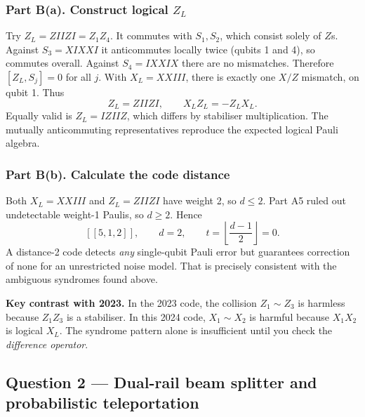 \subsubsection*{Part B(a). Construct logical $Z_L$}
Try $Z_L=ZIIZI=Z_1Z_4$. It commutes with $S_1,S_2$, which consist solely of $Z$s. Against $S_3=XIXXI$ it anticommutes locally twice (qubits 1 and 4), so commutes overall. Against $S_4=IXXIX$ there are no mismatches. Therefore $[Z_L,S_j]=0$ for all $j$.
With $X_L=XXIII$, there is exactly one $X/Z$ mismatch, on qubit 1. Thus
\begin{equation}\boxed{Z_L=ZIIZI,\qquad X_LZ_L=-Z_LX_L.}\end{equation}
Equally valid is $Z_L=IZIIZ$, which differs by stabiliser multiplication. The mutually anticommuting representatives reproduce the expected logical Pauli algebra.

\subsubsection*{Part B(b). Calculate the code distance}
Both $X_L=XXIII$ and $Z_L=ZIIZI$ have weight 2, so $d\le2$. Part A5 ruled out undetectable weight-1 Paulis, so $d\ge2$. Hence
\begin{equation}\boxed{[[5,1,2]],\qquad d=2,\qquad t=\left\lfloor\frac{d-1}{2}\right\rfloor=0.}\end{equation}
A distance-2 code detects \emph{any} single-qubit Pauli error but guarantees correction of none for an unrestricted noise model. That is precisely consistent with the ambiguous syndromes found above.
\begin{examtip}\textbf{Key contrast with 2023.} In the 2023 code, the collision $Z_1\sim Z_3$ is harmless because $Z_1Z_3$ is a stabiliser. In this 2024 code, $X_1\sim X_2$ is harmful because $X_1X_2$ is logical $X_L$. The syndrome pattern alone is insufficient until you check the \emph{difference operator}.\end{examtip}

\subsection{Question 2 --- Dual-rail beam splitter and probabilistic teleportation}
